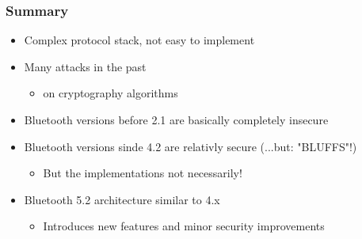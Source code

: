 \subsubsection{Summary}
\begin{itemize}
  \item Complex protocol stack, not easy to implement
  \item Many attacks in the past  
    \begin{itemize}
      \item on cryptography algorithms
    \end{itemize}
  \item Bluetooth versions before 2.1 are basically completely insecure 
  \item Bluetooth versions sinde 4.2 are relativly secure (...but: "BLUFFS"!) 
    \begin{itemize}
      \item But the implementations not necessarily!
    \end{itemize}
  \item Bluetooth 5.2 architecture similar to 4.x 
    \begin{itemize}
      \item Introduces new features and minor security improvements
    \end{itemize}
\end{itemize}

